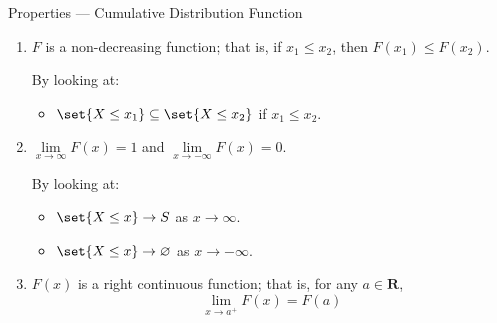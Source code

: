 \begin{Definition}{Properties --- Cumulative Distribution Function}{}
    \begin{enumerate}[label=(\arabic*)]
        \item $ F $ is a non-decreasing function; that is, if $ x_1\le x_2 $,
              then $ F(x_1)\le F(x_2) $.

              By looking at:
              \begin{itemize}
                  \item $ \set{X\le x_1}\subseteq \set{X\le x_2} $
                        if $ x_1\le x_2 $.
              \end{itemize}
        \item $ \lim\limits_{{x} \to {\infty}} F(x)=1 $
              and $ \lim\limits_{{x} \to {-\infty}} F(x)=0 $.

              By looking at:
              \begin{itemize}
                  \item $ \set{X\le x} \to S $ as $ x\to\infty $.
                  \item $ \set{X\le x} \to \varnothing $ as $ x\to-\infty $.
              \end{itemize}
        \item $ F(x) $ is a right continuous function; that is,
              for any $ a\in\mathbf{R} $,
              \[ \lim\limits_{{x} \to {a^+}} F(x)=F(a) \]
    \end{enumerate}
\end{Definition}
